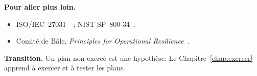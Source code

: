 \bigskip

\begin{boxinfo}
\textbf{Pour aller plus loin.}
\begin{itemize}
    \item ISO/IEC~27031~\cite{iso27031_2011}~; NIST SP~800-34~\cite{nist80034}.
    \item Comité de Bâle, \emph{Principles for Operational
          Resilience}~\cite{bcbs2021resilience}.
\end{itemize}
\end{boxinfo}

\begin{boxinfo}
\textbf{Transition.} Un plan non exercé est une hypothèse. Le
Chapitre~\ref{chap:exercer} apprend à exercer et à tester les plans.
\end{boxinfo}
